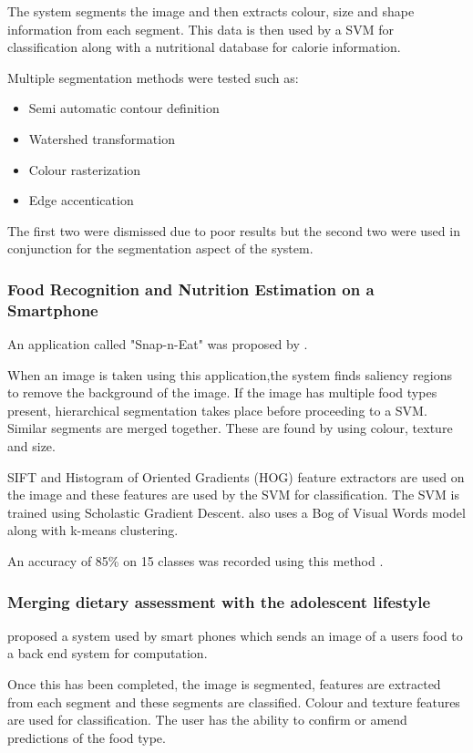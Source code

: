The system segments the image and then extracts colour, size and shape information from each segment. This data is then used by a SVM for classification along with a nutritional database for calorie information. 

Multiple segmentation methods were tested such as:
\begin{itemize}
	\item{Semi automatic contour definition}
	\item{Watershed transformation}
	\item{Colour rasterization}
	\item{Edge accentication}
\end{itemize}
The first two were dismissed due to poor results but the second two were used in conjunction for the segmentation aspect of the system.

\subsubsection*{Food Recognition and Nutrition Estimation on a Smartphone}
An application called "Snap-n-Eat" was proposed by \parencite{snap}.

When an image is taken using this application,the system finds saliency regions to remove the background of the image.
If the image has multiple food types present, hierarchical segmentation takes place before proceeding to a SVM. Similar segments are merged together.
These are found by using colour, texture and size.

SIFT and Histogram of Oriented Gradients (HOG) feature extractors are used on the image and these features are used by the SVM for classification.
The SVM is trained using Scholastic Gradient Descent.
\parencite{snap} also uses a Bog of Visual Words model along with k-means clustering.

An accuracy of 85\% on 15 classes was recorded using this method \parencite{snap}.

\subsubsection*{Merging dietary assessment with the adolescent lifestyle}
\parencite{schap2014merging} proposed a system used by smart phones which sends an image of a users food to a back end system for computation.

Once this has been completed, the image is segmented, features are extracted from each segment and these segments are classified.
Colour and texture features are used for classification.
The user has the ability to confirm or amend predictions of the food type.

